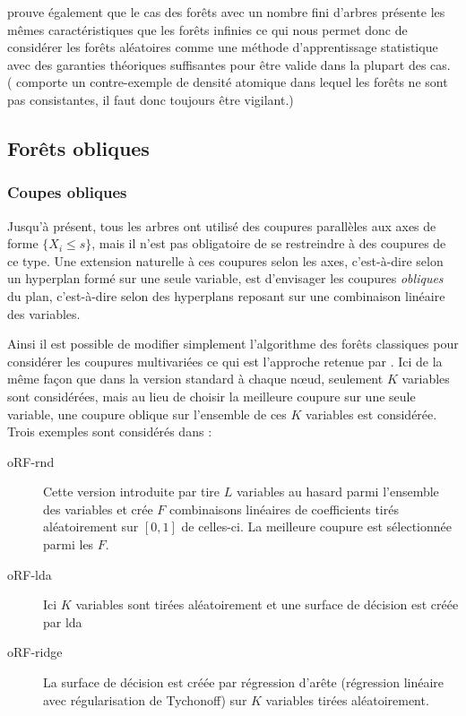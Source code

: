 \citet{Scornet2014} prouve également que le cas des forêts avec un nombre fini d'arbres présente les mêmes caractéristiques que les forêts infinies ce qui nous permet donc de considérer les forêts aléatoires comme une méthode d'apprentissage statistique avec des garanties théoriques suffisantes pour être valide dans la plupart des cas. (\cite{Biau2008} comporte un contre-exemple de densité atomique dans lequel les forêts ne sont pas consistantes, il faut donc toujours être vigilant.)

\subsection{Forêts obliques}

\subsubsection{Coupes obliques}

Jusqu'à présent, tous les arbres ont utilisé des coupures parallèles aux axes de forme $\{ X_i \leq s \}$, mais il n'est pas obligatoire de se restreindre à des coupures de ce type. Une extension naturelle à ces coupures selon les axes, c'est-à-dire selon un hyperplan formé sur une seule variable, est d'envisager les coupures \emph{obliques} du plan, c'est-à-dire selon des hyperplans reposant sur une combinaison linéaire des variables.

Ainsi il est possible de modifier simplement l'algorithme des forêts classiques pour considérer les coupures multivariées ce qui est l'approche retenue par \citet{Menze2011}. Ici de la même façon que dans la version standard à chaque nœud, seulement $K$ variables sont considérées, mais au lieu de choisir la meilleure coupure sur une seule variable, une coupure oblique sur l'ensemble de ces $K$ variables est considérée. Trois exemples sont considérés dans \citet{Menze2011}:
\begin{description}
    \item[oRF-rnd] Cette version introduite par \citet{Breiman2001} tire $L$ variables au hasard parmi l'ensemble des variables et crée $F$ combinaisons linéaires de coefficients tirés aléatoirement sur $[0,1]$ de celles-ci. La meilleure coupure est sélectionnée parmi les $F$.
    \item[oRF-lda] Ici $K$ variables sont tirées aléatoirement et une surface de décision est créée par \ac{lda}
    \item[oRF-ridge] La surface de décision est créée par régression d'arête (régression linéaire avec régularisation de Tychonoff) sur $K$ variables tirées aléatoirement.
\end{description}

